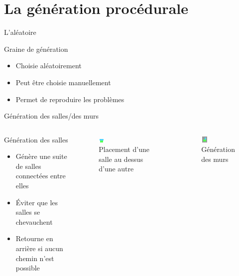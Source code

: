 \documentclass{beamer}
\begin{document}
{\section{La génération procédurale}
\begin{frame}{L'al\'eatoire}
    \begin{block}{Graine de génération}
        \begin{itemize}
            \item[\bullet] Choisie aléatoirement
            \item[\bullet] Peut être choisie manuellement
            \item[\bullet] Permet de reproduire les problèmes
        \end{itemize}
    \end{block}
\end{frame}

\begin{frame}{Génération des salles/des murs}
    \begin{columns}
        \begin{block}{Génération des salles}
            \begin{itemize}
                \item[\bullet] Génère une suite de salles connectées entre elles
                \item[\bullet] Éviter que les salles se chevauchent
                \item[\bullet] Retourne en arrière si aucun chemin n'est possible
            \end{itemize}
        \end{block}
        \begin{figure}
            \centering
            \includegraphics[height=0.2\textheight]{images/room_placement}
            \caption{Placement d'une salle au dessus d'une autre}
        \end{figure}
        \begin{figure}
            \centering
            \includegraphics[height=0.2\textheight]{images/filling_the_world}
            \caption{Génération des murs}
        \end{figure}
    \end{columns}
\end{frame}

}
\end{document}
